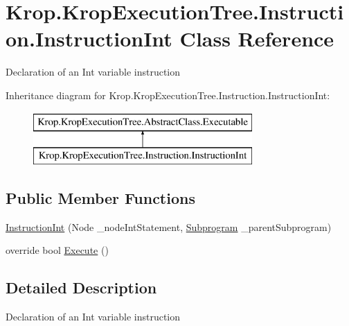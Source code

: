 \hypertarget{class_krop_1_1_krop_execution_tree_1_1_instruction_1_1_instruction_int}{}\section{Krop.\+Krop\+Execution\+Tree.\+Instruction.\+Instruction\+Int Class Reference}
\label{class_krop_1_1_krop_execution_tree_1_1_instruction_1_1_instruction_int}


Declaration of an Int variable instruction  


Inheritance diagram for Krop.\+Krop\+Execution\+Tree.\+Instruction.\+Instruction\+Int\+:\begin{figure}[H]
\begin{center}
\leavevmode
\includegraphics[height=2.000000cm]{class_krop_1_1_krop_execution_tree_1_1_instruction_1_1_instruction_int}
\end{center}
\end{figure}
\subsection*{Public Member Functions}
\begin{DoxyCompactItemize}
\item 
\mbox{\hyperlink{class_krop_1_1_krop_execution_tree_1_1_instruction_1_1_instruction_int_adb7584e305c335b0ba223dfa6316266e}{Instruction\+Int}} (Node \+\_\+node\+Int\+Statement, \mbox{\hyperlink{class_krop_1_1_krop_execution_tree_1_1_subprogram}{Subprogram}} \+\_\+parent\+Subprogram)
\item 
override bool \mbox{\hyperlink{class_krop_1_1_krop_execution_tree_1_1_instruction_1_1_instruction_int_ac2e3bee4e5a115c09e03815df9f6ae0e}{Execute}} ()
\end{DoxyCompactItemize}


\subsection{Detailed Description}
Declaration of an Int variable instruction 



